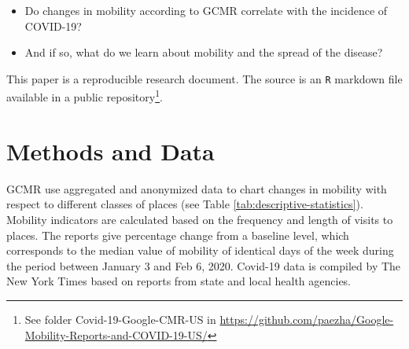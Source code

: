 \documentclass[]{elsarticle} %
\providecommand{\tightlist}{%
  \setlength{\itemsep}{0pt}\setlength{\parskip}{0pt}}
\begin{document}
\begin{itemize}
\tightlist
\item
  Do changes in mobility according to GCMR correlate with the incidence
  of COVID-19?
\item
  And if so, what do we learn about mobility and the spread of the
  disease?
\end{itemize}

This paper is a reproducible research document. The source is an
\texttt{R} markdown file available in a public
repository\footnote{See folder Covid-19-Google-CMR-US in \url{https://github.com/paezha/Google-Mobility-Reports-and-COVID-19-US/}}.

\hypertarget{methods-and-data}{%
\section{Methods and Data}\label{methods-and-data}}

GCMR use aggregated and anonymized data to chart changes in mobility
with respect to different classes of places (see Table
\ref{tab:descriptive-statistics}). Mobility indicators are calculated
based on the frequency and length of visits to places. The reports give
percentage change from a baseline level, which corresponds to the median
value of mobility of identical days of the week during the period
between January 3 and Feb 6, 2020. Covid-19 data is compiled by The New
York Times based on reports from state and local health agencies.
\end{document}
